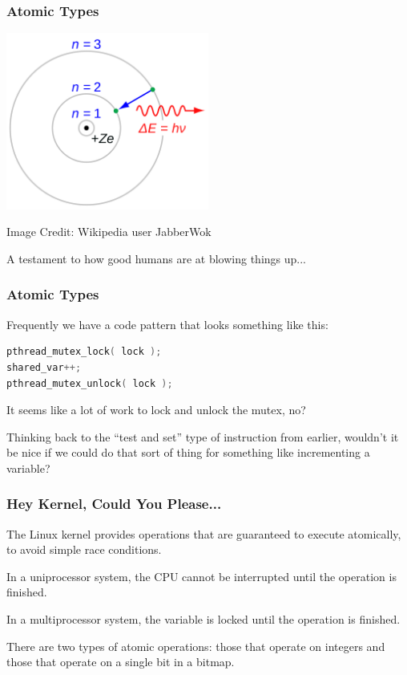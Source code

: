 \begin{frame}
	\frametitle{Atomic Types}
	\begin{center}
		\includegraphics[width=0.5\textwidth]{images/bohrmodel.png}
	\end{center}
	\hfill Image Credit: Wikipedia user JabberWok

	A testament to how good humans are at blowing things up...

\end{frame}



\begin{frame}[fragile]
	\frametitle{Atomic Types}

	Frequently we have a code pattern that looks something like this:

	\begin{lstlisting}[language=C]
pthread_mutex_lock( lock );
shared_var++;
pthread_mutex_unlock( lock );
\end{lstlisting}

	It seems like a lot of work to lock and unlock the mutex, no?

	Thinking back to the ``test and set'' type of instruction from earlier, wouldn't it be nice if we could do that sort of thing for something like incrementing a variable?

\end{frame}

\begin{frame}
	\frametitle{Hey Kernel, Could You Please...}

	The Linux kernel provides operations that are guaranteed to execute atomically, to avoid simple race conditions.

	In a uniprocessor system, the CPU cannot be interrupted until the operation is finished.

	In a multiprocessor system, the variable is locked until the operation is finished.

	There are two types of atomic operations: those that operate on integers and those that operate on a single bit in a bitmap.

\end{frame}

